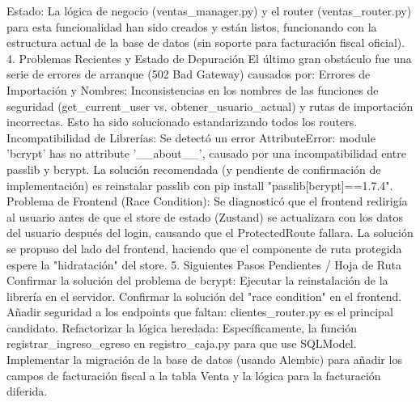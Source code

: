 Estado: La lógica de negocio (ventas_manager.py) y el router (ventas_router.py) para esta funcionalidad han sido creados y están listos, funcionando con la estructura actual de la base de datos (sin soporte para facturación fiscal oficial).
4. Problemas Recientes y Estado de Depuración
El último gran obstáculo fue una serie de errores de arranque (502 Bad Gateway) causados por:
Errores de Importación y Nombres: Inconsistencias en los nombres de las funciones de seguridad (get_current_user vs. obtener_usuario_actual) y rutas de importación incorrectas. Esto ha sido solucionado estandarizando todos los routers.
Incompatibilidad de Librerías: Se detectó un error AttributeError: module 'bcrypt' has no attribute '__about__', causado por una incompatibilidad entre passlib y bcrypt. La solución recomendada (y pendiente de confirmación de implementación) es reinstalar passlib con pip install "passlib[bcrypt]==1.7.4".
Problema de Frontend (Race Condition): Se diagnosticó que el frontend redirigía al usuario antes de que el store de estado (Zustand) se actualizara con los datos del usuario después del login, causando que el ProtectedRoute fallara. La solución se propuso del lado del frontend, haciendo que el componente de ruta protegida espere la "hidratación" del store.
5. Siguientes Pasos Pendientes / Hoja de Ruta
Confirmar la solución del problema de bcrypt: Ejecutar la reinstalación de la librería en el servidor.
Confirmar la solución del "race condition" en el frontend.
Añadir seguridad a los endpoints que faltan: clientes_router.py es el principal candidato.
Refactorizar la lógica heredada: Específicamente, la función registrar_ingreso_egreso en registro_caja.py para que use SQLModel.
Implementar la migración de la base de datos (usando Alembic) para añadir los campos de facturación fiscal a la tabla Venta y la lógica para la facturación diferida.



